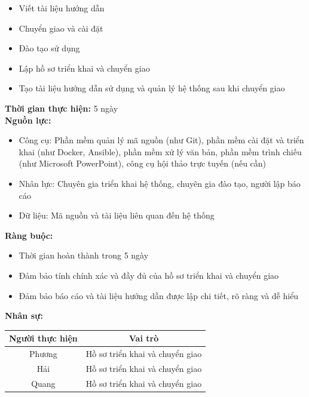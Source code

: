 {\begin{minipage}{\textwidth}
\begin{itemize}
        \begin{itemize}
            \item Viết tài liệu hướng dẫn
            \item Chuyển giao và cài đặt
            \item Đào tạo sử dụng
            \item Lập hồ sơ triển khai và chuyển giao
            \item Tạo tài liệu hướng dẫn sử dụng và quản lý hệ thống sau khi chuyển giao
        \end{itemize}
    \end{itemize}
    \vspace{0.5cm}
    \noindent \textbf{Thời gian thực hiện:} 5 ngày \\
    \noindent \textbf{Nguồn lực:}
    \begin{itemize}
        \item Công cụ: Phần mềm quản lý mã nguồn (như Git), phần mềm cài đặt và triển khai (như Docker, Ansible), phần mềm xử lý văn bản, phần mềm trình chiếu (như Microsoft PowerPoint), công cụ hội thảo trực tuyến (nếu cần)
        \item Nhân lực: Chuyên gia triển khai hệ thống, chuyên gia đào tạo, người lập báo cáo
        \item Dữ liệu: Mã nguồn và tài liệu liên quan đến hệ thống
    \end{itemize}
    \vspace{0.5cm}
    \noindent \textbf{Ràng buộc:}
    \begin{itemize}
        \item Thời gian hoàn thành trong 5 ngày
        \item Đảm bảo tính chính xác và đầy đủ của hồ sơ triển khai và chuyển giao
        \item Đảm bảo báo cáo và tài liệu hướng dẫn được lập chi tiết, rõ ràng và dễ hiểu
    \end{itemize}
    \vspace{0.5cm}
    \noindent \textbf{Nhân sự:}
    \begin{longtable}{|c|c|}
    \hline
    \textbf{Người thực hiện} & \textbf{Vai trò} \\
    \hline
    Phương & Hồ sơ triển khai và chuyển giao \\
    Hải & Hồ sơ triển khai và chuyển giao \\
    Quang & Hồ sơ triển khai và chuyển giao \\
    \hline
    \end{longtable}

\end{minipage}}
